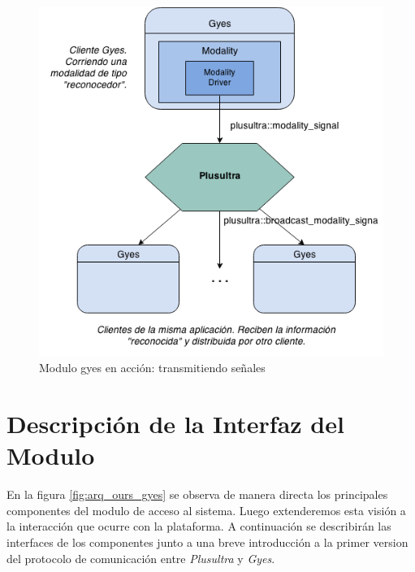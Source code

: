\begin{center}
  \begin{figure}[h]
    \includegraphics[scale=0.7]{gfx/gyes_action}
    \caption{Modulo gyes en acción: transmitiendo señales}
    \label{fig:arq_ours_gyes_action}
  \end{figure}
\end{center}


\section{Descripción de la Interfaz del Modulo} \label{sec:enlace_api}
En la figura \ref{fig:arq_ours_gyes} se observa de manera directa los principales componentes del modulo de acceso al sistema. Luego extenderemos esta visión a la interacción que ocurre con la plataforma.
A continuación se describirán las interfaces de los componentes junto a una breve introducción a la primer version del protocolo de comunicación entre \emph{Plusultra} y \emph{Gyes}.


